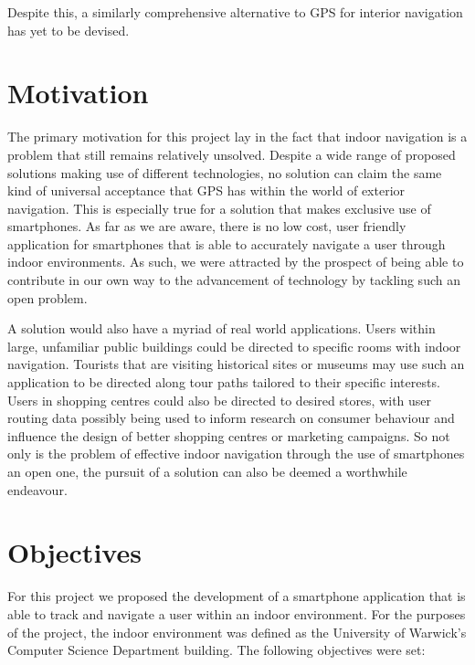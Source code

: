 \documentclass[12pt,a4paper]{report}
\begin{document}
Despite this, a similarly comprehensive alternative to GPS for interior navigation has yet to be devised.

\section{Motivation}

The primary motivation for this project lay in the fact that indoor navigation is a problem that still remains relatively unsolved. Despite a wide range of proposed solutions making use of different technologies, no solution can claim the same kind of universal acceptance that GPS has within the world of exterior navigation. This is especially true for a solution that makes exclusive use of smartphones. As far as we are aware, there is no low cost, user friendly application for smartphones that is able to accurately navigate a user through indoor environments. As such, we were attracted by the prospect of being able to contribute in our own way to the advancement of technology by tackling such an open problem.

A solution would also have a myriad of real world applications. Users within large, unfamiliar public buildings could be directed to specific rooms with indoor navigation. Tourists that are visiting historical sites or museums may use such an application to be directed along tour paths tailored to their specific interests. Users in shopping centres could also be directed to desired stores, with user routing data possibly being used to inform research on consumer behaviour and influence the design of better shopping centres or marketing campaigns. So not only is the problem of effective indoor navigation through the use of smartphones an open one, the pursuit of a solution can also be deemed a worthwhile endeavour.

\section{Objectives}

For this project we proposed the development of a smartphone application that is able to track and navigate a user within an indoor environment. For the purposes of the project, the indoor environment was defined as the University of Warwick's Computer Science Department building. The following objectives were set:\\
\end{document}

